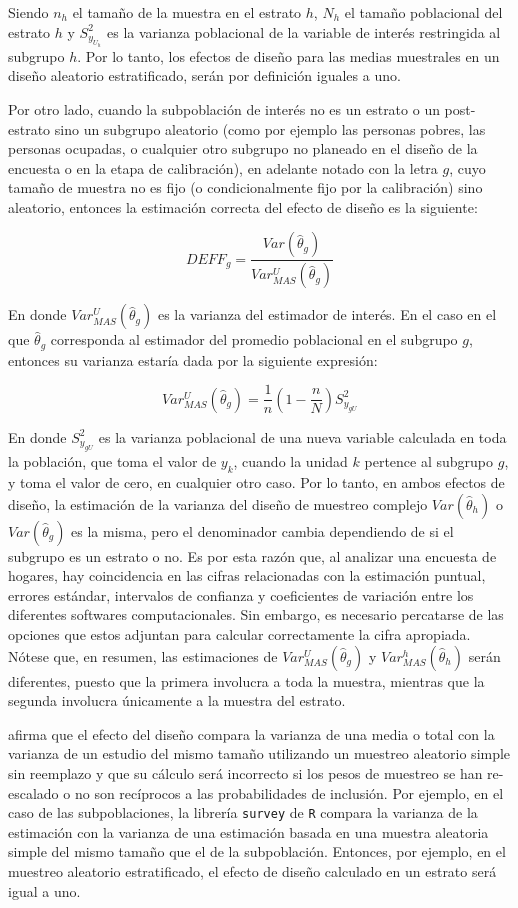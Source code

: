 \documentclass[
  12pt,
  spanish,
]{book}
\begin{document}
Siendo \(n_h\) el tamaño de la muestra en el estrato \(h\), \(N_h\) el tamaño poblacional del estrato \(h\) y \(S^2_{y_{U_h}}\) es la varianza poblacional de la variable de interés restringida al subgrupo \(h\). Por lo tanto, los efectos de diseño para las medias muestrales en un diseño aleatorio estratificado, serán por definición iguales a uno.

Por otro lado, cuando la subpoblación de interés no es un estrato o un post-estrato sino un subgrupo aleatorio (como por ejemplo las personas pobres, las personas ocupadas, o cualquier otro subgrupo no planeado en el diseño de la encuesta o en la etapa de calibración), en adelante notado con la letra \(g\), cuyo tamaño de muestra no es fijo (o condicionalmente fijo por la calibración) sino aleatorio, entonces la estimación correcta del efecto de diseño es la siguiente:

\[
DEFF_g = \frac{Var (\hat\theta_g) }{Var_{MAS}^U(\hat\theta_g) }
\]

En donde \(Var_{MAS}^U(\hat\theta_g)\) es la varianza del estimador de interés. En el caso en el que \(\hat\theta_g\) corresponda al estimador del promedio poblacional en el subgrupo \(g\), entonces su varianza estaría dada por la siguiente expresión:

\[
Var_{MAS}^U(\hat\theta_g)=\frac{1}{n}\left(1-\frac{n}{N}\right)S^2_{y_{gU}}
\]

En donde \(S^2_{y_{gU}}\) es la varianza poblacional de una nueva variable calculada en toda la población, que toma el valor de \(y_k\), cuando la unidad \(k\) pertence al subgrupo \(g\), y toma el valor de cero, en cualquier otro caso. Por lo tanto, en ambos efectos de diseño, la estimación de la varianza del diseño de muestreo complejo \(Var (\hat\theta_h)\) o \(Var (\hat\theta_g)\) es la misma, pero el denominador cambia dependiendo de si el subgrupo es un estrato o no. Es por esta razón que, al analizar una encuesta de hogares, hay coincidencia en las cifras relacionadas con la estimación puntual, errores estándar, intervalos de confianza y coeficientes de variación entre los diferentes softwares computacionales. Sin embargo, es necesario percatarse de las opciones que estos adjuntan para calcular correctamente la cifra apropiada. Nótese que, en resumen, las estimaciones de \(Var_{MAS}^U(\hat\theta_g)\) y \(Var_{MAS}^h(\hat\theta_h)\) serán diferentes, puesto que la primera involucra a toda la muestra, mientras que la segunda involucra únicamente a la muestra del estrato.

\citet{Lumley_2010} afirma que el efecto del diseño compara la varianza de una media o total con la varianza de un estudio del mismo tamaño utilizando un muestreo aleatorio simple sin reemplazo y que su cálculo será incorrecto si los pesos de muestreo se han re-escalado o no son recíprocos a las probabilidades de inclusión. Por ejemplo, en el caso de las subpoblaciones, la librería \texttt{survey} de \texttt{R} compara la varianza de la estimación con la varianza de una estimación basada en una muestra aleatoria simple del mismo tamaño que el de la subpoblación. Entonces, por ejemplo, en el muestreo aleatorio estratificado, el efecto de diseño calculado en un estrato será igual a uno.
\end{document}
